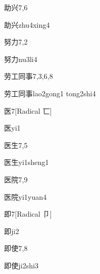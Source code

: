 \begin{entry}{助兴}{7,6}
  \begin{phonetics}{助兴}{zhu4xing4}
  \end{phonetics}
\end{entry}

\begin{entry}{努力}{7,2}
  \begin{phonetics}{努力}{nu3li4}
  \end{phonetics}
\end{entry}

\begin{entry}{劳工同事}{7,3,6,8}
  \begin{phonetics}{劳工同事}{lao2gong1 tong2shi4}
  \end{phonetics}
\end{entry}

\begin{entry}{医}{7}[Radical 匸]
  \begin{phonetics}{医}{yi1}
  \end{phonetics}
\end{entry}

\begin{entry}{医生}{7,5}
  \begin{phonetics}{医生}{yi1sheng1}
  \end{phonetics}
\end{entry}

\begin{entry}{医院}{7,9}
  \begin{phonetics}{医院}{yi1yuan4}
  \end{phonetics}
\end{entry}

\begin{entry}{即}{7}[Radical 卩]
  \begin{phonetics}{即}{ji2}
  \end{phonetics}
\end{entry}

\begin{entry}{即使}{7,8}
  \begin{phonetics}{即使}{ji2shi3}
  \end{phonetics}
\end{entry}

